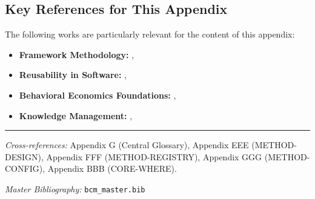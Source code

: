 \vspace{0.5em}

\subsection{Key References for This Appendix}

The following works are particularly relevant for the content of this appendix:

\begin{itemize}[nosep]
    \item \textbf{Framework Methodology:} \citet{kuhn1962structure}, \citet{lakatos1970falsification}
    \item \textbf{Reusability in Software:} \citet{parnas1972criteria}, \citet{gamma1994design}
    \item \textbf{Behavioral Economics Foundations:} \citet{PAP-kahneman1979prospectprospect}, \citet{thaler2008nudge}
    \item \textbf{Knowledge Management:} \citet{nonaka1995knowledge}, \citet{davenport1998working}
\end{itemize}

\nocite{bcm_master}



\vspace{1em}
\hrule
\vspace{0.5em}

\noindent\textit{Cross-references:}
Appendix G (Central Glossary),
Appendix EEE (METHOD-DESIGN),
Appendix FFF (METHOD-REGISTRY),
Appendix GGG (METHOD-CONFIG),
Appendix BBB (CORE-WHERE).

\noindent\textit{Master Bibliography:} \texttt{bcm\_master.bib}


